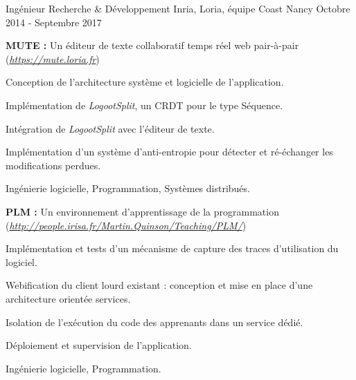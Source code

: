 \begin{cventries}
\cventry
    {Ingénieur Recherche \& Développement} %
    {Inria, Loria, équipe Coast} %
    {Nancy} %
    {Octobre 2014 - Septembre 2017} %
    {}

\vspace{-1.5em}
\begin{cvparagraph}
    \textbf{MUTE :} Un éditeur de texte collaboratif temps réel web pair-à-pair (\href{https://mute.loria.fr}{\emph{https://mute.loria.fr}})

    \medskip
    \begin{cvitems} %
        \item Conception de l'architecture système et logicielle de l'application.
        \item Implémentation de \emph{LogootSplit}, un CRDT pour le type Séquence.
        \item Intégration de \emph{LogootSplit} avec l'éditeur de texte.
        \item Implémentation d'un système d'anti-entropie pour détecter et ré-échanger les modifications perdues.
    \end{cvitems}

    \medskip
     Ingénierie logicielle, Programmation, Systèmes distribués.
\end{cvparagraph}

\begin{cvparagraph}
    \textbf{PLM :} Un environnement d'apprentissage de la programmation (\href{http://people.irisa.fr/Martin.Quinson/Teaching/PLM/}{\emph{http://people.irisa.fr/Martin.Quinson/Teaching/PLM/}})

    \medskip
    \begin{cvitems} %
        \item Implémentation et tests d'un mécanisme de capture des traces d'utilisation du logiciel.
        \item Webification du client lourd existant : conception et mise en place d'une architecture orientée services.
        \item Isolation de l'exécution du code des apprenants dans un service dédié.
        \item Déploiement et supervision de l'application.
    \end{cvitems}

    \medskip
     Ingénierie logicielle, Programmation.
\end{cvparagraph}

\end{cventries}
